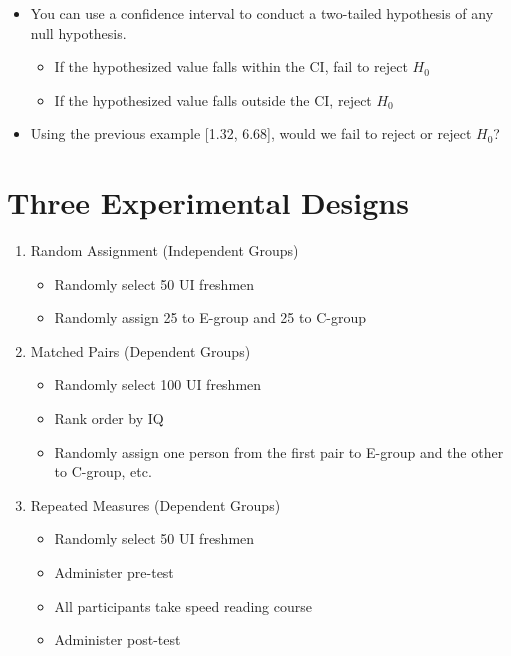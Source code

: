 \documentclass[12pt]{article}
\begin{document}
\begin{itemize}
\itemsep1pt\parskip0pt
\item
  You can use a confidence interval to conduct a two-tailed hypothesis
  of any null hypothesis.

  \begin{itemize}
  \itemsep1pt\parskip0pt
  \item
    If the hypothesized value falls within the CI, fail to reject
    \(H_{0}\)
  \item
    If the hypothesized value falls outside the CI, reject \(H_{0}\)
  \end{itemize}
\item
  Using the previous example {[}1.32, 6.68{]}, would we fail to reject
  or reject \(H_{0}\)?
\end{itemize}

\section{Three Experimental Designs}\label{three-experimental-designs}

\begin{enumerate}
\def\labelenumi{\arabic{enumi}.}
\itemsep1pt\parskip0pt
\item
  Random Assignment (Independent Groups)

  \begin{itemize}
  \itemsep1pt\parskip0pt
  \item
    Randomly select 50 UI freshmen
  \item
    Randomly assign 25 to E-group and 25 to C-group
  \end{itemize}
\item
  Matched Pairs (Dependent Groups)

  \begin{itemize}
  \itemsep1pt\parskip0pt
  \item
    Randomly select 100 UI freshmen
  \item
    Rank order by IQ
  \item
    Randomly assign one person from the first pair to E-group and the
    other to C-group, etc.
  \end{itemize}
\item
  Repeated Measures (Dependent Groups)

  \begin{itemize}
  \itemsep1pt\parskip0pt
  \item
    Randomly select 50 UI freshmen
  \item
    Administer pre-test
  \item
    All participants take speed reading course
  \item
    Administer post-test
  \end{itemize}
\end{enumerate}
\end{document}
